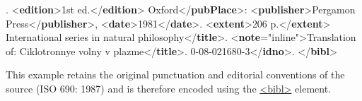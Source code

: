 \begin{shaded}
.\mbox{}\newline 
{<\textbf{edition}>}1st ed.{</\textbf{edition}>}\mbox{}\newline 
{}Oxford{</\textbf{pubPlace}>}:\mbox{}\newline 
{<\textbf{publisher}>}Pergamon Press{</\textbf{publisher}>},\mbox{}\newline 
{<\textbf{date}>}1981{</\textbf{date}>}.\mbox{}\newline 
{<\textbf{extent}>}206 p.{</\textbf{extent}>}\mbox{}\newline 
{}International series in natural philosophy{</\textbf{title}>}.\mbox{}\newline 
{<\textbf{note}\hspace*{1em}{place}="{inline}">}Translation of:\mbox{}\newline 
{}Ciklotronnye volny v\mbox{}\newline 
\hspace*{1em}\hspace*{1em}\hspace*{1em}\hspace*{1em} plazme{</\textbf{title}>}.\mbox{}\newline 
{}0-08-021680-3{</\textbf{idno}>}.\mbox{}\newline 
{}\mbox{}\newline 
{</\textbf{bibl}>}\end{shaded}\egroup\par \noindent    \par
This example retains the original punctuation and editorial conventions of the source (ISO 690: 1987) and is therefore encoded using the \hyperref[TEI.bibl]{<bibl>} element.\par
